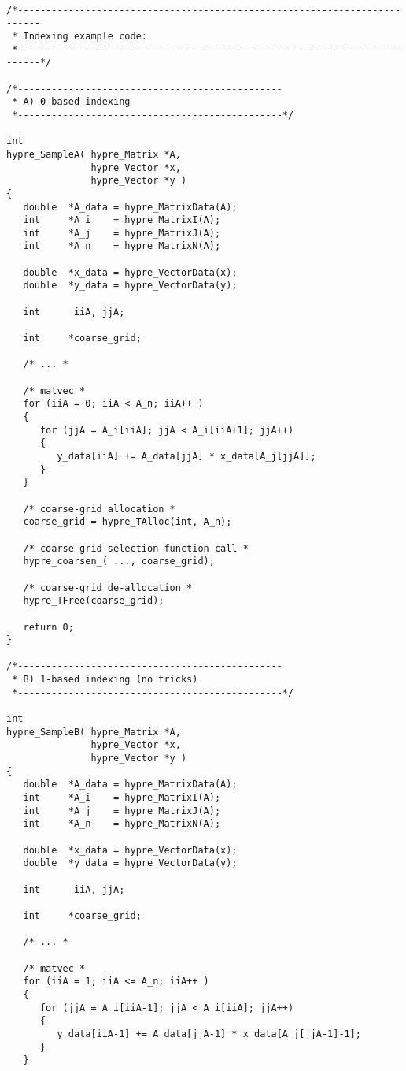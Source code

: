 \begin{verbatim}

/*--------------------------------------------------------------------------
 * Indexing example code:
 *--------------------------------------------------------------------------*/

/*-----------------------------------------------
 * A) 0-based indexing
 *-----------------------------------------------*/

int
hypre_SampleA( hypre_Matrix *A,
               hypre_Vector *x,
               hypre_Vector *y )
{
   double  *A_data = hypre_MatrixData(A);
   int     *A_i    = hypre_MatrixI(A);
   int     *A_j    = hypre_MatrixJ(A);
   int     *A_n    = hypre_MatrixN(A);

   double  *x_data = hypre_VectorData(x);
   double  *y_data = hypre_VectorData(y);

   int      iiA, jjA;

   int     *coarse_grid;

   /* ... *

   /* matvec *
   for (iiA = 0; iiA < A_n; iiA++ )
   {
      for (jjA = A_i[iiA]; jjA < A_i[iiA+1]; jjA++)
      {
         y_data[iiA] += A_data[jjA] * x_data[A_j[jjA]];
      }
   }

   /* coarse-grid allocation *
   coarse_grid = hypre_TAlloc(int, A_n);

   /* coarse-grid selection function call *
   hypre_coarsen_( ..., coarse_grid);

   /* coarse-grid de-allocation *
   hypre_TFree(coarse_grid);

   return 0;
}

/*-----------------------------------------------
 * B) 1-based indexing (no tricks)
 *-----------------------------------------------*/

int
hypre_SampleB( hypre_Matrix *A,
               hypre_Vector *x,
               hypre_Vector *y )
{
   double  *A_data = hypre_MatrixData(A);
   int     *A_i    = hypre_MatrixI(A);
   int     *A_j    = hypre_MatrixJ(A);
   int     *A_n    = hypre_MatrixN(A);

   double  *x_data = hypre_VectorData(x);
   double  *y_data = hypre_VectorData(y);

   int      iiA, jjA;

   int     *coarse_grid;

   /* ... *

   /* matvec *
   for (iiA = 1; iiA <= A_n; iiA++ )
   {
      for (jjA = A_i[iiA-1]; jjA < A_i[iiA]; jjA++)
      {
         y_data[iiA-1] += A_data[jjA-1] * x_data[A_j[jjA-1]-1];
      }
   }


\end{verbatim}
